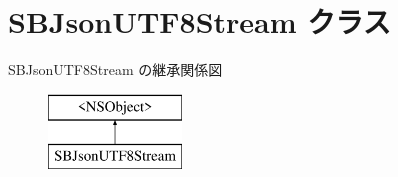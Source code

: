 \hypertarget{interface_s_b_json_u_t_f8_stream}{}\section{S\+B\+Json\+U\+T\+F8\+Stream クラス}
\label{interface_s_b_json_u_t_f8_stream}
S\+B\+Json\+U\+T\+F8\+Stream の継承関係図\begin{figure}[H]
\begin{center}
\leavevmode
\includegraphics[height=2.000000cm]{interface_s_b_json_u_t_f8_stream}
\end{center}
\end{figure}

